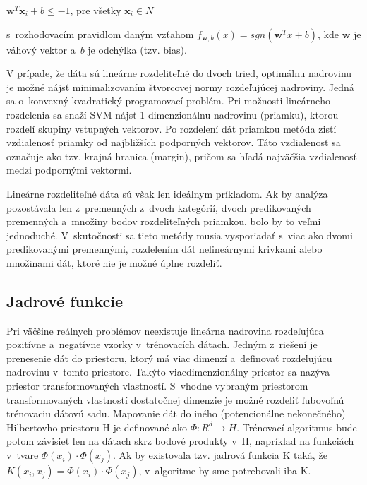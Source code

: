     $\textbf{w}^{T}\textbf{x}_{i} + b \leq -1$, pre všetky $\textbf{x}_{i} \in N$
    
s~rozhodovacím pravidlom daným vzťahom $f_{\textbf{w},b} ( x ) = sgn(\textbf{w}^{T}x + b )$, kde $\textbf{w}$ je váhový vektor a~$b$ je odchýlka (tzv. bias).

V prípade, že dáta sú lineárne rozdeliteľné do dvoch tried, optimálnu nadrovinu je možné nájsť minimalizovaním štvorcovej normy rozdeľujúcej nadroviny. Jedná sa o~konvexný kvadratický programovací problém.
Pri možnosti lineárneho rozdelenia sa snaží SVM nájsť 1-dimenzionálnu nadrovinu (priamku), ktorou rozdelí skupiny vstupných vektorov. Po rozdelení dát priamkou metóda zistí vzdialenosť priamky od najbližších podporných vektorov. Táto vzdialenosť sa označuje ako tzv. krajná hranica (margin), pričom sa hľadá najväčšia vzdialenosť medzi podpornými vektormi.  

Lineárne rozdeliteľné dáta sú však len ideálnym príkladom. Ak by analýza pozostávala len z~premenných z~dvoch kategórií, dvoch predikovaných premenných a~množiny bodov rozdeliteľných priamkou, bolo by to veľmi jednoduché. V~skutočnosti sa tieto metódy musia vysporiadať s~viac ako dvomi predikovanými premennými, rozdelením dát nelineárnymi krivkami alebo množinami dát, ktoré nie je možné úplne rozdeliť. 

\subsection{Jadrové funkcie}

Pri väčšine reálnych problémov neexistuje lineárna nadrovina rozdeľujúca pozitívne a~negatívne vzorky v~trénovacích dátach. Jedným z~riešení je prenesenie dát do priestoru, ktorý má viac dimenzí a~definovať rozdeľujúcu nadrovinu v~tomto priestore. Takýto viacdimenzionálny priestor sa nazýva priestor transformovaných vlastností. S~vhodne vybraným priestorom transformovaných vlastností dostatočnej dimenzie je možné rozdeliť ľubovoľnú trénovaciu dátovú sadu.
Mapovanie dát do iného (potencionálne nekonečného) Hilbertovho priestoru H je definované ako $\Phi:R^{d} \rightarrow H$. Trénovací algoritmus bude potom závisieť len na dátach skrz bodové produkty v~H, napríklad na funkciách v~tvare $\Phi(x_{i})\cdot\Phi(x_{j})$. Ak by existovala tzv. jadrová funkcia K taká, že $K(x_{i},x_{j}) = \Phi(x_{i})\cdot\Phi(x_{j})$, v~algoritme by sme potrebovali iba K. 

